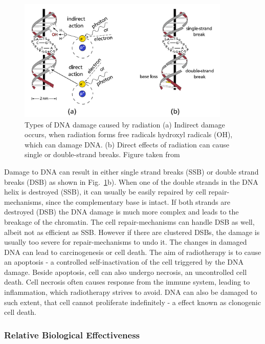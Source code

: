 \documentclass[type=dr, dr=rernat, accentcolor=tud7b,colorbacktitle, bigchapter, openright, twoside, 12pt ]{tudthesis}
\begin{document}
\begin{figure}[H]
\begin{center}
\includegraphics[width=0.9\textwidth]{./Images/SSB_DSB.png}
\caption{Types of DNA damage caused by radiation (a) Indirect damage occurs, when radiation forms free radicals hydroxyl radicals (OH), which can damage DNA. (b) Direct effects of radiation can cause single or double-strand breaks. 
Figure taken from \cite{Richter2012}}
\label{ida}
\end{center}
\end{figure}


Damage to DNA can result in either single strand breaks (SSB) or double strand breaks (DSB) as shown in Fig.~\ref{ida}b). When one of the double strands in the DNA helix is destroyed (SSB), it can usually be easily repaired by cell 
repair-mechanisms, since the complementary base is intact. If both strands are destroyed (DSB) the DNA damage is much more complex and leads to the breakage of the chromatin. The cell repair-mechanisms can handle DSB as well, 
albeit not as efficient as SSB. However if there are clustered DSBs, the damage is usually too severe for repair-mechanisms to undo it. The changes in damaged DNA can lead to carcinogenesis or cell death. The aim of radiotherapy is to 
cause an apoptosis - a controlled self-inactivation of the cell triggered by the DNA damage. Beside apoptosis, cell can also undergo necrosis, an uncontrolled cell death. Cell necrosis often causes response from the immune system, leading to inflammation, which
radiotherapy strives to avoid. DNA can also be damaged to such extent, that cell cannot proliferate indefinitely - a effect known as clonogenic cell death.


\subsubsection{Relative Biological Effectiveness}
\label{RBE}
\end{document}
